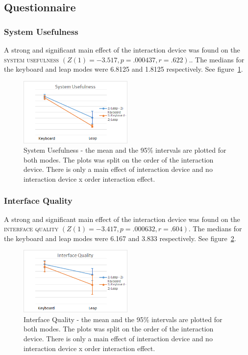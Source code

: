 \subsection{Questionnaire}
\subsubsection{System Usefulness}

A strong and significant main effect of the interaction device was found on the \textsc{system usefulness} $(Z(1) = -3.517, p = .000437, r = .622)$.. The medians for the keyboard and leap modes were 6.8125 and 1.8125 respectively. See figure~\ref{fig:system_usefulness}.

\begin{figure}[H]
\centering
\includegraphics[width=0.5\textwidth]{imgs/results/system_usefulness}
\caption{System Usefulness - the mean and the 95\% intervals are plotted for both modes. The plots was split on the order of the interaction device. There is only a main effect of interaction device and no interaction device x order interaction effect.}
\label{fig:system_usefulness}
\end{figure}

\subsubsection{Interface Quality}

A strong and significant main effect of the interaction device was found on the \textsc{interface quality} $(Z(1) = -3.417, p = .000632, r = .604)$. The medians for the keyboard and leap modes were 6.167 and 3.833 respectively. See figure~\ref{fig:interface_quality}.

\begin{figure}[H]
\centering
\includegraphics[width=0.5\textwidth]{imgs/results/interface_quality}
\caption{Interface Quality - the mean and the 95\% intervals are plotted for both modes. The plots was split on the order of the interaction device. There is only a main effect of interaction device and no interaction device x order interaction effect.}
\label{fig:interface_quality}
\end{figure}
